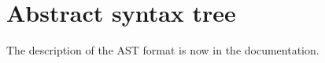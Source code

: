\chapter{Abstract syntax tree}
\label{chap-abstract-syntax-tree}

The description of the AST format is now in the \cleavir{} documentation.

